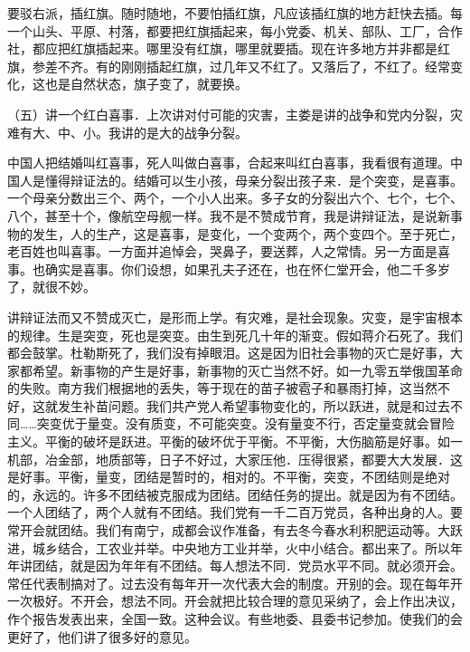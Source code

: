 要驳右派，插红旗。随时随地，不要怕插红旗，凡应该插红旗的地方赶快去插。每一个山头、平原、村落，都要把红旗插起来，每小党委、机关、部队、工厂，合作社，都应把红旗插起来。哪里没有红旗，哪里就要插。现在许多地方并非都是红旗，参差不齐。有的刚刚插起红旗，过几年又不红了。又落后了，不红了。经常变化，这也是自然状态，旗子变了，就要换。

（五）讲一个红白喜事．上次讲对付可能的灾害，主娄是讲的战争和党内分裂，灾难有大、中、小。我讲的是大的战争分裂。

中国人把结婚叫红喜事，死人叫做白喜事，合起来叫红白喜事，我看很有道理。中国人是懂得辩证法的。结婚可以生小孩，母亲分裂出孩子来．是个突变，是喜事。一个母亲分数出三个、两个，一个小人出来。多子女的分裂出六个、七个，七个、八个，甚至十个，像航空母舰一样。我不是不赞成节育，我是讲辩证法，是说新事物的发生，人的生产，这是喜事，是变化，一个变两个，两个变四个。至于死亡，老百姓也叫喜事。一方面并追悼会，哭鼻子，要送葬，人之常情。另一方面是喜事。也确实是喜事。你们设想，如果孔夫子还在，也在怀仁堂开会，他二千多岁了，就很不妙。

讲辩证法而又不赞成灭亡，是形而上学。有灾难，是社会现象。灾变，是宇宙根本的规律。生是突变，死也是突变。由生到死几十年的渐变。假如蒋介石死了。我们都会鼓掌。杜勒斯死了，我们没有掉眼泪。这是因为旧社会事物的灭亡是好事，大家都希望。新事物的产生是好事，新事物的灭亡当然不好。如一九零五举俄国革命的失败。南方我们根据地的丢失，等于现在的苗子被雹子和暴雨打掉，这当然不好，这就发生补苗问题。我们共产党人希望事物变化的，所以跃进，就是和过去不同……突变优于量变。没有质变，不可能突变。没有量变不行，否定量变就会冒险主义。平衡的破坏是跃进。平衡的破坏优于平衡。不平衡，大伤脑筋是好事。如一机部，冶金部，地质部等，日子不好过，大家压他．压得很紧，都要大大发展．这是好事。平衡，量变，团结是暂时的，相对的。不平衡，突变，不团结则是绝对的，永远的。许多不团结被克服成为团结。团结任务的提出。就是因为有不团结。一个人团结了，两个人就有不团结。我们党有一千二百万党员，各种出身的人。要常开会就团结。我们有南宁，成都会议作准备，有去冬今春水利积肥运动等。大跃进，城乡结合，工农业并举。中央地方工业并举，火中小结合。都出来了。所以年年讲团结，就是因为年年有不团结。每人想法不同．党员水平不同。就必须开会。常任代表制搞对了。过去没有每年开一次代表大会的制度。开别的会。现在每年开一次极好。不开会，想法不同。开会就把比较合理的意见采纳了，会上作出决议，作个报告发表出来，全国一致。这种会议。有些地委、县委书记参加。使我们的会更好了，他们讲了很多好的意见。

